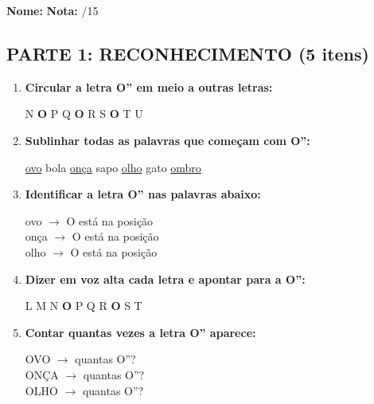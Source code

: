 \begin{exercicio}

\noindent\textbf{Nome:} \underline{\hspace{4cm}} \quad \textbf{Nota:} \underline{\hspace{1cm}}/15

\subsection*{PARTE 1: RECONHECIMENTO (5 itens)}

\begin{enumerate}
  \item \textbf{Circular a letra O'' em meio a outras letras:}
  \begin{center}
  N \quad \textbf{O} \quad P \quad Q \quad \textbf{O} \quad R \quad S \quad \textbf{O} \quad T \quad U
  \end{center}

  \item \textbf{Sublinhar todas as palavras que começam com O'':}
  \begin{center}
  \uline{ovo} \quad bola \quad \uline{onça} \quad sapo \quad \uline{olho} \quad gato \quad \uline{ombro}
  \end{center}

  \item \textbf{Identificar a letra O'' nas palavras abaixo:}
  \begin{center}
  ovo $\rightarrow$ O está na posição \underline{\hspace{1cm}} \\
  onça $\rightarrow$ O está na posição \underline{\hspace{1cm}} \\
  olho $\rightarrow$ O está na posição \underline{\hspace{1cm}}
  \end{center}

  \item \textbf{Dizer em voz alta cada letra e apontar para a O'':}
  \begin{center}
  L \quad M \quad N \quad \textbf{O} \quad P \quad Q \quad R \quad \textbf{O} \quad S \quad T
  \end{center}

  \item \textbf{Contar quantas vezes a letra O'' aparece:}
  \begin{center}
  OVO $\rightarrow$ quantas O''? \underline{\hspace{1cm}} \\
  ONÇA $\rightarrow$ quantas O''? \underline{\hspace{1cm}} \\
  OLHO $\rightarrow$ quantas O''? \underline{\hspace{1cm}}
  \end{center}
\end{enumerate}


\end{exercicio}
